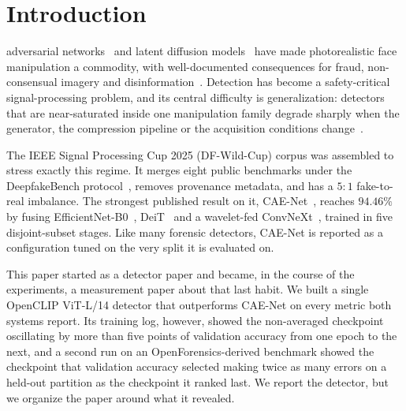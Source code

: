 \documentclass[10pt,journal]{IEEEtran}
\begin{document}
\maketitle
\IEEEdisplaynontitleabstractindextext
\IEEEpeerreviewmaketitle

\section{Introduction}
 adversarial
networks~\cite{goodfellow2014gan,karras2020stylegan2} and latent diffusion
models~\cite{rombach2022ldm} have made photorealistic face manipulation a
commodity, with well-documented consequences for fraud, non-consensual imagery
and disinformation~\cite{verdoliva2020media,tolosana2020survey}. Detection has
become a safety-critical signal-processing problem, and its central difficulty
is generalization: detectors that are near-saturated inside one manipulation
family degrade sharply when the generator, the compression pipeline or the
acquisition conditions change~\cite{wang2020cnngenerated,corvi2023diffusion}.

The IEEE Signal Processing Cup 2025 (DF-Wild-Cup) corpus was assembled to stress
exactly this regime. It merges eight public benchmarks under the DeepfakeBench
protocol~\cite{yan2023deepfakebench}, removes provenance metadata, and has a
$5{:}1$ fake-to-real imbalance. The strongest published result on it,
CAE-Net~\cite{bhattacharjee2026caenet}, reaches $94.46\%$ by fusing
EfficientNet-B0~\cite{tan2019efficientnet}, DeiT~\cite{touvron2021deit} and a
wavelet-fed ConvNeXt~\cite{liu2022convnext}, trained in five disjoint-subset
stages. Like many forensic detectors, CAE-Net is reported as a configuration
tuned on the very split it is evaluated on.

This paper started as a detector paper and became, in the course of the
experiments, a measurement paper about that last habit. We built a single
OpenCLIP ViT-L/14 detector that outperforms CAE-Net on every metric both
systems report. Its training log, however, showed the non-averaged checkpoint
oscillating by more than five points of validation accuracy from one epoch to
the next, and a second run on an OpenForensics-derived benchmark showed the
checkpoint that validation accuracy selected making twice as many errors on a
held-out partition as the checkpoint it ranked last. We report the detector,
but we organize the paper around what it revealed.
\end{document}
